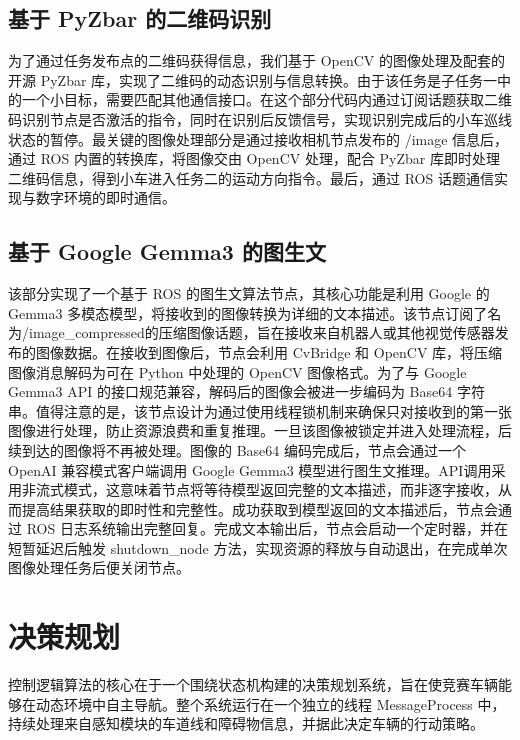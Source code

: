 \documentclass[UTF8]{ctexart}
\begin{document}
\subsection{基于 PyZbar 的二维码识别}
为了通过任务发布点的二维码获得信息，我们基于 OpenCV 的图像处理及配套的开源 PyZbar 库，实现了二维码的动态识别与信息转换。由于该任务是子任务一中的一个小目标，需要匹配其他通信接口。在这个部分代码内通过订阅话题获取二维码识别节点是否激活的指令，同时在识别后反馈信号，实现识别完成后的小车巡线状态的暂停。最关键的图像处理部分是通过接收相机节点发布的 /image 信息后，通过 ROS 内置的转换库，将图像交由 OpenCV 处理，配合 PyZbar 库即时处理二维码信息，得到小车进入任务二的运动方向指令。最后，通过 ROS 话题通信实现与数字环境的即时通信。

\subsection{基于 Google Gemma3 的图生文}
该部分实现了一个基于 ROS 的图生文算法节点，其核心功能是利用 Google 的 Gemma3 \cite{gemmateam2025gemma3technicalreport}多模态模型，将接收到的图像转换为详细的文本描述。该节点订阅了名为/image\_compressed的压缩图像话题，旨在接收来自机器人或其他视觉传感器发布的图像数据。在接收到图像后，节点会利用 CvBridge 和 OpenCV 库，将压缩图像消息解码为可在 Python 中处理的 OpenCV 图像格式。为了与 Google Gemma3 API 的接口规范兼容，解码后的图像会被进一步编码为 Base64 字符串。值得注意的是，该节点设计为通过使用线程锁机制来确保只对接收到的第一张图像进行处理，防止资源浪费和重复推理。一旦该图像被锁定并进入处理流程，后续到达的图像将不再被处理。图像的 Base64 编码完成后，节点会通过一个 OpenAI 兼容模式客户端调用 Google Gemma3 模型进行图生文推理。API调用采用非流式模式，这意味着节点将等待模型返回完整的文本描述，而非逐字接收，从而提高结果获取的即时性和完整性。成功获取到模型返回的文本描述后，节点会通过 ROS 日志系统输出完整回复。完成文本输出后，节点会启动一个定时器，并在短暂延迟后触发 shutdown\_node 方法，实现资源的释放与自动退出，在完成单次图像处理任务后便关闭节点。

\section{决策规划}
控制逻辑算法的核心在于一个围绕状态机构建的决策规划系统，旨在使竞赛车辆能够在动态环境中自主导航。整个系统运行在一个独立的线程 MessageProcess 中，持续处理来自感知模块的车道线和障碍物信息，并据此决定车辆的行动策略。
\end{document}
